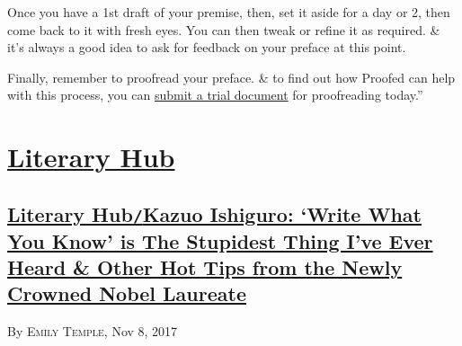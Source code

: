 \documentclass[oneside]{book}
\numberwithin{equation}{section}
\begin{document}
Once you have a 1st draft of your premise, then, set it aside for a day or 2, then come back to it with fresh eyes. You can then tweak or refine it as required. \& it's always a good idea to ask for feedback on your preface at this point.

Finally, remember to proofread your preface. \& to find out how Proofed can help with this process, you can \href{https://proofed.co.uk/author/book-editing-and-proofreading/}{submit a trial document} for proofreading today.''


\chapter{\href{https://lithub.com/}{Literary Hub}}

\section{\href{https://lithub.com/kazuo-ishiguro-write-what-you-know-is-the-stupidest-thing-ive-ever-heard/}{Literary Hub\texttt{/}Kazuo Ishiguro: `Write What You Know' is The Stupidest Thing I've Ever Heard \& Other Hot Tips from the Newly Crowned Nobel Laureate}}
\hfill By \textsc{Emily Temple}, Nov 8, 2017
\end{document}
